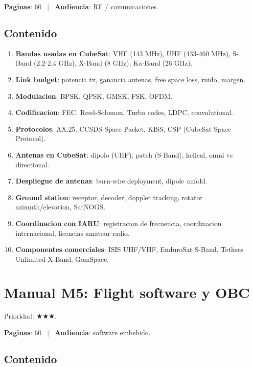 \documentclass[11pt,a4paper,oneside]{report}
\begin{document}
\textbf{Paginas}: 60 ~|~ \textbf{Audiencia}: RF / comunicaciones.

\section{Contenido}

\begin{enumerate}[leftmargin=2em]
  \item \textbf{Bandas usadas en CubeSat}: VHF (143 MHz), UHF (433-460 MHz),
        S-Band (2.2-2.4 GHz), X-Band (8 GHz), Ka-Band (26 GHz).
  \item \textbf{Link budget}: potencia tx, ganancia antenas, free space
        loss, ruido, margen.
  \item \textbf{Modulacion}: BPSK, QPSK, GMSK, FSK, OFDM.
  \item \textbf{Codificacion}: FEC, Reed-Solomon, Turbo codes, LDPC,
        convolutional.
  \item \textbf{Protocolos}: AX.25, CCSDS Space Packet, KISS, CSP (CubeSat
        Space Protocol).
  \item \textbf{Antenas en CubeSat}: dipolo (UHF), patch (S-Band), helical,
        omni vs directional.
  \item \textbf{Despliegue de antenas}: burn-wire deployment, dipole
        unfold.
  \item \textbf{Ground station}: receptor, decoder, doppler tracking,
        rotator azimuth/elevation, SatNOGS.
  \item \textbf{Coordinacion con IARU}: registracion de frecuencia,
        coordinacion internacional, licencias amateur radio.
  \item \textbf{Componentes comerciales}: ISIS UHF/VHF, EnduroSat S-Band,
        Tethers Unlimited X-Band, GomSpace.
\end{enumerate}

\chapter{Manual M5: Flight software y OBC}

\begin{prioritario}
Prioridad: $\bigstar\bigstar\bigstar$.
\end{prioritario}

\textbf{Paginas}: 60 ~|~ \textbf{Audiencia}: software embebido.

\section{Contenido}
\end{document}
